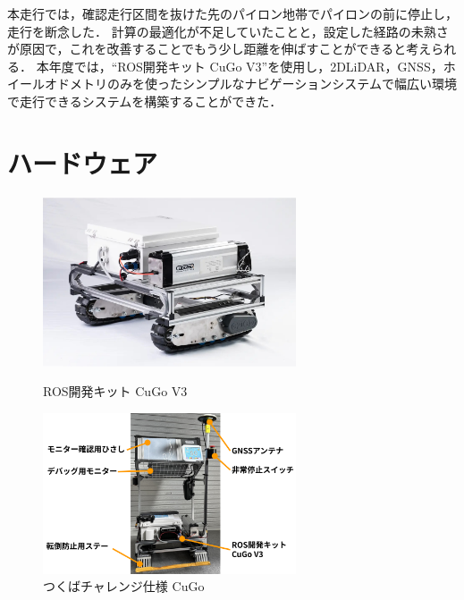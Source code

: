 \documentclass[platex,dvipdfmx]{rbproceedings}
\begin{document}
本走行では，確認走行区間を抜けた先のパイロン地帯でパイロンの前に停止し，走行を断念した．
計算の最適化が不足していたことと，設定した経路の未熟さが原因で，これを改善することでもう少し距離を伸ばすことができると考えられる．
本年度では，“ROS開発キット CuGo V3”を使用し，2DLiDAR，GNSS，ホイールオドメトリのみを使ったシンプルなナビゲーションシステムで幅広い環境で走行できるシステムを構築することができた．

\section{ハードウェア}

\begin{figure}[bth]
   \centering
   \begin{minipage}[b]{.45\linewidth}
       \centering   
       \includegraphics[keepaspectratio,width=75mm]{fig/cugo_ros.jpg}
       \caption{ROS開発キット CuGo V3}
       \label{fig:cugo_ros}
   \end{minipage}
   \begin{minipage}[b]{.45\linewidth}
       \centering
       \includegraphics[keepaspectratio,width=75mm]{fig/cugo_tsukuba.png}
       \caption{つくばチャレンジ仕様 CuGo}
       \label{fig:cugo_ros_tsukuba}
   \end{minipage}
\end{figure}
\end{document}
